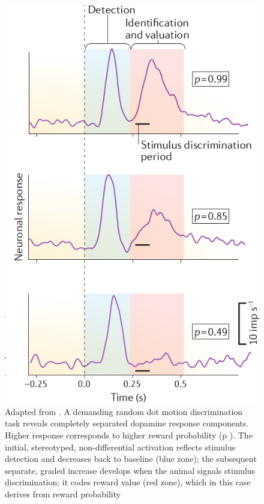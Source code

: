 \begin{figure}
    \centering
    \includegraphics[scale=0.4]{figures/ResponseProbSchultz.png}
    \caption{Adapted from \cite{Schultz2016}. A demanding random dot motion discrimination task reveals completely separated dopamine response components. Higher response corresponds to higher reward probability (p ). The initial, stereotyped, non-differential activation reflects stimulus detection and decreases back to baseline (blue zone); the subsequent separate, graded increase develops when the animal signals stimulus discrimination; it codes reward value (red zone), which in this case derives from reward probability}
    \label{fig:probSchultz}
\end{figure}

